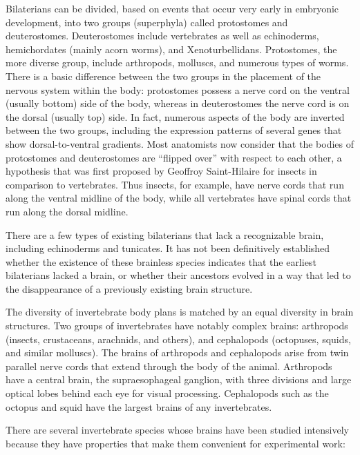 Bilaterians can be divided, based on events that occur very early in embryonic development, into two groups (superphyla) called protostomes and deuterostomes. Deuterostomes include vertebrates as well as echinoderms, hemichordates (mainly acorn worms), and Xenoturbellidans. Protostomes, the more diverse group, include arthropods, molluscs, and numerous types of worms. There is a basic difference between the two groups in the placement of the nervous system within the body: protostomes possess a nerve cord on the ventral (usually bottom) side of the body, whereas in deuterostomes the nerve cord is on the dorsal (usually top) side. In fact, numerous aspects of the body are inverted between the two groups, including the expression patterns of several genes that show dorsal-to-ventral gradients. Most anatomists now consider that the bodies of protostomes and deuterostomes are ``flipped over'' with respect to each other, a hypothesis that was first proposed by Geoffroy Saint-Hilaire for insects in comparison to vertebrates. Thus insects, for example, have nerve cords that run along the ventral midline of the body, while all vertebrates have spinal cords that run along the dorsal midline.

There are a few types of existing bilaterians that lack a recognizable brain, including echinoderms and tunicates. It has not been definitively established whether the existence of these brainless species indicates that the earliest bilaterians lacked a brain, or whether their ancestors evolved in a way that led to the disappearance of a previously existing brain structure.

The diversity of invertebrate body plans is matched by an equal diversity in brain structures. Two groups of invertebrates have notably complex brains: arthropods (insects, crustaceans, arachnids, and others), and cephalopods (octopuses, squids, and similar molluscs). The brains of arthropods and cephalopods arise from twin parallel nerve cords that extend through the body of the animal. Arthropods have a central brain, the supraesophageal ganglion, with three divisions and large optical lobes behind each eye for visual processing. Cephalopods such as the octopus and squid have the largest brains of any invertebrates.

There are several invertebrate species whose brains have been studied intensively because they have properties that make them convenient for experimental work:

